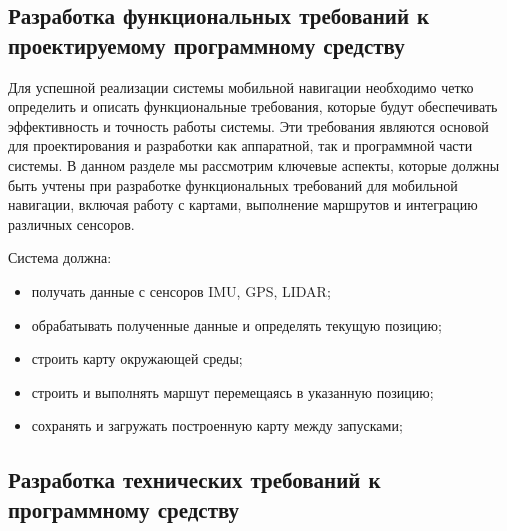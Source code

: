 {%
%
%
%

\subsection{Разработка функциональных требований к проектируемому программному
средству}
	Для успешной реализации системы мобильной навигации необходимо четко
	определить и описать функциональные требования, которые будут обеспечивать
	эффективность и точность работы системы. Эти требования являются основой для
	проектирования и разработки как аппаратной, так и программной части системы.
	В данном разделе мы рассмотрим ключевые аспекты, которые должны быть учтены
	при разработке функциональных требований для мобильной навигации, включая
	работу с картами, выполнение маршрутов и интеграцию различных сенсоров.

Система должна:
\begin{itemize}
	\item получать данные с сенсоров IMU, GPS, LIDAR;
	\item обрабатывать полученные данные и определять текущую позицию;
	\item строить карту окружающей среды;
	\item строить и выполнять маршут перемещаясь в указанную позицию;
	\item сохранять и загружать построенную карту между запусками;
\end{itemize}

\subsection{Разработка технических требований к программному средству}

}
